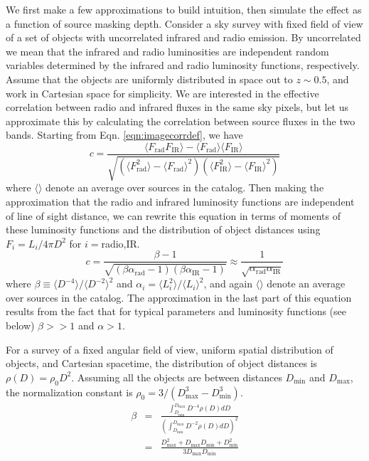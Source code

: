 \documentclass[numberedappendix]{emulateapj}
\newcommand{\mintext}{\text{min}}
\newcommand{\maxtext}{\text{max}}
\newcommand{\rad}{\text{rad}}
\newcommand{\ir}{\text{IR}}
\begin{document}
We first make a few approximations to build intuition, then simulate the effect as a function of source masking depth. Consider a sky survey with fixed field of view of a set of objects with uncorrelated infrared and radio emission. By uncorrelated we mean that the infrared and radio luminosities are independent random variables determined by the infrared and radio luminosity functions, respectively. Assume that the objects are uniformly distributed in space out to $z\sim0.5$, and work in Cartesian space for simplicity. We are interested in the effective correlation between radio and infrared fluxes in the same sky pixels, but let us approximate this by calculating the correlation between source fluxes in the two bands. Starting from Eqn. \ref{eqn:imagecorrdef}, we have
\begin{equation} %
	c = \frac{\langle F_\rad F_\ir \rangle-\langle F_\rad\rangle\langle F_\ir\rangle}{\sqrt{(\langle F_\rad^2\rangle-\langle F_\rad\rangle^2)(\langle F_\ir^2\rangle-\langle F_\ir\rangle^2)}}
\end{equation}
where $\langle\rangle$ denote an average over sources in the catalog. Then making the approximation that the radio and infrared luminosity functions are independent of line of sight distance, we can rewrite this equation in terms of moments of these luminosity functions and the distribution of object distances using $F_i=L_i/4\pi D^2$ for $i=$radio,IR.
\begin{equation}
\label{eqn:cresult}
	c = \frac{\beta-1}{\sqrt{(\beta\alpha_\rad-1)(\beta\alpha_\ir-1)}}\approx\frac{1}{\sqrt{\alpha_\rad \alpha_\ir}}
\end{equation}
where $\beta\equiv\langle D^{-4}\rangle/\langle D^{-2}\rangle^2$ and $\alpha_i=\langle L_i^2\rangle/\langle L_i\rangle^2$, and again $\langle\rangle$ denote an average over sources in the catalog. The approximation in the last part of this equation results from the fact that for typical parameters and luminosity functions (see below) $\beta>>1$ and $\alpha>1$. 

For a survey of a fixed angular field of view, uniform spatial distribution of objects, and Cartesian spacetime, the distribution of object distances is $\rho(D)=\rho_0 D^2$. Assuming all the objects are between distances $D_\mintext$ and $D_\maxtext$, the normalization constant is $\rho_0=3/(D_\maxtext^3-D_\mintext^3)$.
\begin{eqnarray}
	\beta &=& \frac{\int_{D_\mintext}^{D_\maxtext}D^{-4}\rho(D)dD}{\left(\int_{D_\mintext}^{D_\maxtext}D^{-2}\rho(D)dD\right)^2}\\
	 &=&\frac{D_\maxtext^2+D_\maxtext D_\mintext+D_\mintext^2}{3D_\maxtext D_\mintext}
\end{eqnarray}
\end{document}

